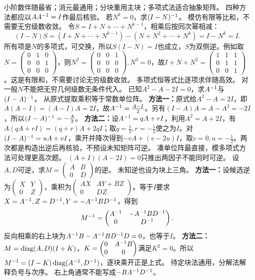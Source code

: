 {小阶数伴随最省；消元最通用；分块重用主块；多项式法适合抽象矩阵。}
{四种方法都应以$AA^{-1}=I$作最后核验。}
{若$N^k=0$，求$(I-N)^{-1}$。}
{模仿有限等比和，不需要无穷级数收敛。}
{令$S=I+N+\cdots+N^{k-1}$，相乘后按同次幂相减：
\[(I-N)S=(I+N+\cdots+N^{k-1})-(N+N^2+\cdots+N^k)=I-N^k=I.\]
所有项是$N$的多项式，可交换，所以$S(I-N)=I$也成立，$S$为双侧逆。例如取$N=\begin{pmatrix}0&1&0\\0&0&1\\0&0&0\end{pmatrix}$，则$N^2=\begin{pmatrix}0&0&1\\0&0&0\\0&0&0\end{pmatrix},N^3=0$，故$I+N+N^2=\begin{pmatrix}1&1&1\\0&1&1\\0&0&1\end{pmatrix}$。这是有限和，不需要讨论无穷级数收敛。}
{多项式恒等式比逐项求伴随高效。}
{对一般$N$不能把无穷几何级数无条件代入。}
{已知$A^2-A-2I=0$，求$A^{-1}$与$(I-A)^{-1}$。}
{从原式提取乘积等于常数单位阵。}
{\textbf{方法一：}原式给$A^2-A=2I$，即$A(A-I)=(A-I)A=2I$，故$A^{-1}=\frac{A-I}{2}$。另有$(I-A)A=A-A^2=-2I$，所以$(I-A)^{-1}=-\frac{A}{2}$。
\textbf{方法二：}设$A^{-1}=qA+rI$，利用$A^2=A+2I$，有$A(qA+rI)=(q+r)A+2qI$；取$q=\frac{1}{2},r=-\frac{1}{2}$使之为$I$。对$(I-A)^{-1}=uA+vI$，乘开并降次得到$-vA+(v-2u)I$，取$v=0,u=-\frac{1}{2}$。两次都是构造出逆后再核验，不预设未知矩阵可逆。}
{凑单位阵最直接，模多项式方法可处理更高次题。}
{$(A+I)(A-2I)=0$只推出两因子不能同时可逆。}
{设$A,D$可逆，求$M=\begin{pmatrix}A&B\\0&D\end{pmatrix}$的逆。}
{未知逆也设为块上三角。}
{\textbf{方法一：}设候选逆为$\begin{pmatrix}X&Y\\0&Z\end{pmatrix}$，乘积为$\begin{pmatrix}AX&AY+BZ\\0&DZ\end{pmatrix}$。等于$I$要求$X=A^{-1},Z=D^{-1},Y=-A^{-1} BD^{-1}$，得到
\[M^{-1}=\begin{pmatrix}A^{-1}&-A^{-1} BD^{-1}\\0&D^{-1}\end{pmatrix}.\]
反向相乘的右上块为$A^{-1} B-A^{-1} BD^{-1} D=0$，也等于$I$。
\textbf{方法二：}$M=\operatorname{diag}(A,D)(I+K)$，$K=\begin{pmatrix}0&A^{-1} B\\0&0\end{pmatrix}$满足$K^2=0$。所以$M^{-1}=(I-K)\operatorname{diag}(A^{-1},D^{-1})$，逐块乘开正是上式。}
{待定块法通用，分解法解释负号与次序。}
{右上角通常不能写成$-B A^{-1} D^{-1}$。}
